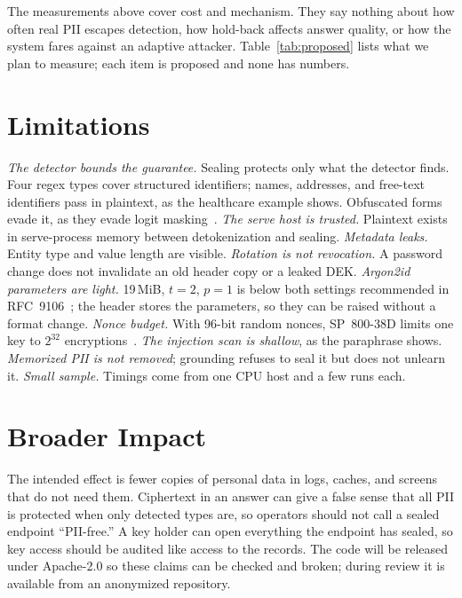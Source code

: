 \documentclass[conference,compsoc]{IEEEtran}
\begin{document}
The measurements above cover cost and mechanism. They say nothing about how often real PII escapes detection, how hold-back affects answer quality, or how the system fares against an adaptive attacker. Table~\ref{tab:proposed} lists what we plan to measure; each item is proposed and none has numbers.

\section{Limitations}
\label{sec:limits}

\textit{The detector bounds the guarantee.} Sealing protects only what the detector finds. Four regex types cover structured identifiers; names, addresses, and free-text identifiers pass in plaintext, as the healthcare example shows. Obfuscated forms evade it, as they evade logit masking~\cite{ram2025constrained}.
\textit{The serve host is trusted.} Plaintext exists in serve-process memory between detokenization and sealing.
\textit{Metadata leaks.} Entity type and value length are visible.
\textit{Rotation is not revocation.} A password change does not invalidate an old header copy or a leaked DEK.
\textit{Argon2id parameters are light.} 19\,MiB, $t{=}2$, $p{=}1$ is below both settings recommended in RFC~9106~\cite{rfc9106}; the header stores the parameters, so they can be raised without a format change.
\textit{Nonce budget.} With 96-bit random nonces, SP~800-38D limits one key to $2^{32}$ encryptions~\cite{nist80038d}.
\textit{The injection scan is shallow}, as the paraphrase shows.
\textit{Memorized PII is not removed}; grounding refuses to seal it but does not unlearn it.
\textit{Small sample.} Timings come from one CPU host and a few runs each.

\section{Broader Impact}

The intended effect is fewer copies of personal data in logs, caches, and screens that do not need them. Ciphertext in an answer can give a false sense that all PII is protected when only detected types are, so operators should not call a sealed endpoint ``PII-free.'' A key holder can open everything the endpoint has sealed, so key access should be audited like access to the records. The code will be released under Apache-2.0 so these claims can be checked and broken; during review it is available from an anonymized repository.
\end{document}

